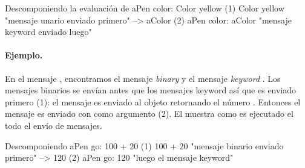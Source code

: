 \documentclass[a4paper,10pt,twoside]{book}
\begin{document}
\begin{example}[decColor]{Descomponiendo la evaluaci\'on de }{}
        aPen color: Color yellow
(1)                       Color yellow        "mensaje unario enviado primero"
                        --> aColor
(2)   aPen color: aColor                 "mensaje keyword enviado luego"
\end{example}

\paragraph{Ejemplo.} En el mensaje , encontramos el mensaje \emph{binary}  y el mensaje \emph{keyword} . Los mensajes binarios se env\'ian antes que los mensajes keyword as\'i que  es enviado primero (1): el mensaje  es enviado al objeto  retornando el número . Entonces el mensaje  es enviado con  como argumento (2).
El  muestra como es ejecutado el todo el env\'io de mensajes.

\begin{example}[decGo]{Descomponiendo }{}
      aPen go: 100 + 20
(1)                 100 + 20           "mensaje binario enviado primero"
                   -->   120
(2)  aPen go: 120                   "luego el mensaje keyword"
\end{example}
\end{document}
